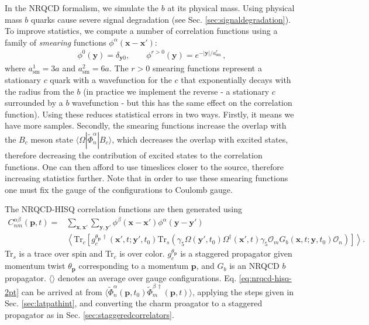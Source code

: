 In the NRQCD formalism, we simulate the $b$ at its physical mass. Using physical mass $b$ quarks cause severe signal degradation (see Sec. \ref{sec:signaldegradation}). To improve statistics, we compute a number of correlation functions using a family of {\it{smearing}} functions $\phi^{\alpha}({\textbf{x}}-{\textbf{x}}')$:
\begin{align}
  \phi^0({\textbf{y}}) = \delta_{\textbf{y}0},\quad\quad
  \phi^{r>0}({\textbf{y}}) = e^{-|{\textbf{y}}|/a^r_{\text{sm}}}\,,
  \label{eq:smearings}
\end{align}
where $a^1_{\text{sm}} = 3a$ and $a^2_{\text{sm}} = 6a$. The $r>0$ smearing functions represent a stationary $c$ quark with a wavefunction for the $c$ that exponentially decays with the radius from the $b$ (in practice we implement the reverse - a stationary $c$ surrounded by a $b$ wavefunction - but this has the same effect on the correlation function). Using these reduces statistical errors in two ways. Firstly, it means we have more samples. Secondly, the smearing functions increase the overlap with the $B_c$ meson state $\langle \Omega | \tilde{\Phi}_n^{\alpha}|B_c\rangle$, which decreases the overlap with excited states, therefore decreasing the contribution of excited states to the correlation functions. One can then afford to use timeslices closer to the source, therefore increasing statistics further. Note that in order to use these smearing functions one must fix the gauge of the configurations to Coulomb gauge.

The NRQCD-HISQ correlation functions are then generated using
\begin{align}
    \label{eq:nrqcd-hisq-2pt}
  C_{nm}^{\alpha \beta}({\textbf{p}},t) =& \sum_{{\textbf{x}},{\textbf{x}}'} \sum_{{\textbf{y}},{\textbf{y}}'}
  \phi^{\beta}({\textbf{x}}-{\textbf{x}}') \phi^{\alpha}({\textbf{y}}-{\textbf{y}}') \\ \nonumber
  &\left\langle \text{Tr}_c \left[  g^{\theta_{\textbf{p}}\,\dagger}_c({\textbf{x}}',t;{\textbf{y}}',t_0) \text{Tr}_s\left( \gamma_5\Omega({\textbf{y}}',t_0) \Omega^{\dagger}({\textbf{x}}',t) \gamma_5 \mathcal{O}_m G_b({\textbf{x}},t;{\textbf{y}},t_0) \mathcal{O}_n \right) \right]\right\rangle.
\end{align}
Tr$_s$ is a trace over spin and Tr$_c$ is over color. $g^{\theta_{\textbf{p}}}_c$ is a staggered propagator given momentum twist $\theta_{\textbf{p}}$ corresponding to a momentum ${\textbf{p}}$, and $G_b$ is an NRQCD $b$ propagator. $\langle\rangle$ denotes an average over gauge configurations. Eq. \eqref{eq:nrqcd-hisq-2pt} can be arrived at from $\langle \tilde{\Phi}_n^{\alpha}({\textbf{p}},t_0) \tilde{\Phi}_m^{\beta\,\dagger}({\textbf{p}},t) \rangle$, applying the steps given in Sec. \ref{sec:latpathint}, and converting the charm proagator to a staggered propagator as in Sec. \ref{sec:staggeredcorrelators}.

